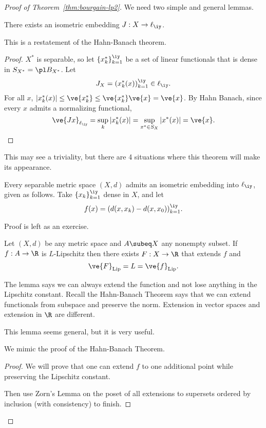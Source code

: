 \begin{proof}[Proof of Theorem~\ref{thm:bourgain-lp2}]
We need two simple and general lemmas.
\begin{lem}
There exists an isometric embedding $J:X\to \ell_\iy$.
\end{lem}
This is a restatement of the Hahn-Banach theorem.
\begin{proof}
$X^*$ is separable, so let $\{x_k^*\}_{k=1}^{\iy}$ be a set of linear functionals that is dense in $S_{X^*}=\pl B_{X^*}$. Let 
\[
J_X = (x_k^*(x))_{k=1}^{\iy}\in\ell_{\iy}.
\]
For all $x$, $|x_k^*(x)|\le \ve{x_k^*}\le \ve{x_k^*} \ve{x}=\ve{x}$.
By Hahn Banach, since every $x$ admits a normalizing functional,
\[
\ve{Jx}_{\ell_{\iy}} = \sup_k |x_k^*(x)|=\sup_{x^*\in S_X} |x^*(x)| = \ve{x}.
\]
\end{proof}
This may see a triviality, but there are 4 situations where this theorem will make its appearance.
\begin{rem}
Every separable metric space $(X,d)$ admits an isometric embedding into $\ell_\iy$, given as follows. Take $\{x_k\}_{k=1}^{\iy}$ dense in $X$, and let
\[
f(x)=(d(x,x_k)-d(x,x_0))_{k=1}^{\iy}.
\]
\end{rem}
Proof is left as an exercise.

\begin{lem}
Let $(X,d)$ be any metric space and $A\subeq X$ any nonempty subset. If $f:A\to \R$ is $L$-Lipschitz then there exists $F:X\to \R$ that extends $f$ and 
\[
\ve{F}_{\text{Lip}} = L = \ve{f}_{\text{Lip}}.
\]
\end{lem}
The lemma says we can always extend the function and not lose anything in the Lipschitz constant.
Recall the Hahn-Banach Theorem says that we can extend functionals from subspace and preserve the norm. Extension in vector spaces and extension in $\R$ are different.

This lemma seems general, but it is very useful.

We mimic the proof of the Hahn-Banach Theorem.

\begin{proof}
We will prove that one can extend $f$ to one additional point while preserving the Lipschitz constant. 

Then use Zorn's Lemma on the poset of all extensions to supersets ordered by inclusion (with consistency) to finish.


\end{proof}
\end{proof}
